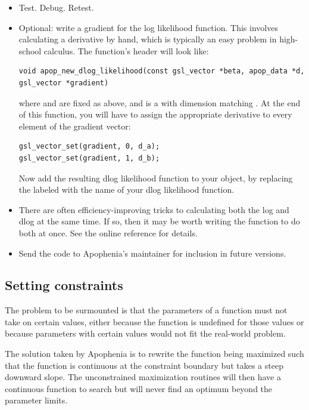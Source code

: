 \begin{itemize}
\item Test. Debug. Retest.

\item Optional: write a gradient for the log likelihood function. This
involves calculating a derivative by hand, which is typically an easy
problem in high-school calculus. The function's header will look like: 
\begin{lstlisting}
void apop_new_dlog_likelihood(const gsl_vector *beta, apop_data *d, gsl_vector *gradient)
\end{lstlisting}
where  and  are fixed as above, and  is a  with dimension matching . 
At the end of this function, you will have to assign the appropriate derivative to every element of the gradient vector:
\begin{lstlisting}
gsl_vector_set(gradient, 0, d_a);
gsl_vector_set(gradient, 1, d_b);
\end{lstlisting}
Now add the resulting dlog likelihood function to your object, by
replacing the  labeled  with
the name of your dlog likelihood function.  

\item There are often efficiency-improving tricks to calculating both the log and
dlog at the same time. If so, then it may be worth writing the 
function to do both at once. See the online reference for details.

\item Send the code to Apophenia's maintainer for inclusion in future
versions.  \end{itemize}


\subsection{Setting
constraints}\label{constraintwriting}

The problem to be surmounted is that the parameters of a function must not take on
certain values, either because the function is undefined for those
values or because parameters with certain values would not fit the
real-world problem.

The solution taken by Apophenia is to rewrite the function being maximized such that the
function is continuous at the constraint boundary but takes a steep
downward slope. The unconstrained maximization routines will then have a 
continuous function to search but will never find an optimum 
beyond the parameter limits.

